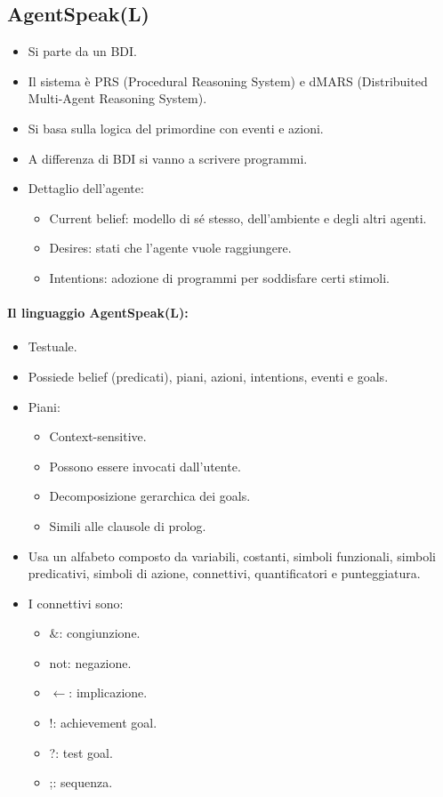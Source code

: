 \subsection{AgentSpeak(L)}


\begin{itemize}
  \item Si parte da un BDI. 
  \item Il sistema è PRS (Procedural Reasoning System) e dMARS (Distribuited Multi-Agent Reasoning System). 
  \item Si basa sulla logica del primordine con eventi e azioni. 
  \item A differenza di BDI si vanno a scrivere programmi. 
  \item Dettaglio dell'agente: 
    \begin{itemize}
      \item Current belief: modello di sé stesso, dell'ambiente e degli altri agenti. 
      \item Desires: stati che l'agente vuole raggiungere. 
      \item Intentions: adozione di programmi per soddisfare certi stimoli.
    \end{itemize}
\end{itemize}

\paragraph{Il linguaggio AgentSpeak(L):}

\begin{itemize}
  \item Testuale. 
  \item Possiede belief (predicati), piani, azioni, intentions, eventi e goals. 
  \item Piani:
    \begin{itemize}
      \item Context-sensitive. 
      \item Possono essere invocati dall'utente. 
      \item Decomposizione gerarchica dei goals.
      \item Simili alle clausole di prolog.
    \end{itemize}
  \item Usa un alfabeto composto da variabili, costanti, simboli funzionali, simboli predicativi, simboli di azione, connettivi, quantificatori e punteggiatura. 
  \item I connettivi sono: 
    \begin{itemize}
      \item $\&$: congiunzione. 
      \item not: negazione. 
      \item $\leftarrow$: implicazione. 
      \item !: achievement goal. 
      \item ?: test goal. 
      \item ;: sequenza.
    \end{itemize}
\end{itemize}


